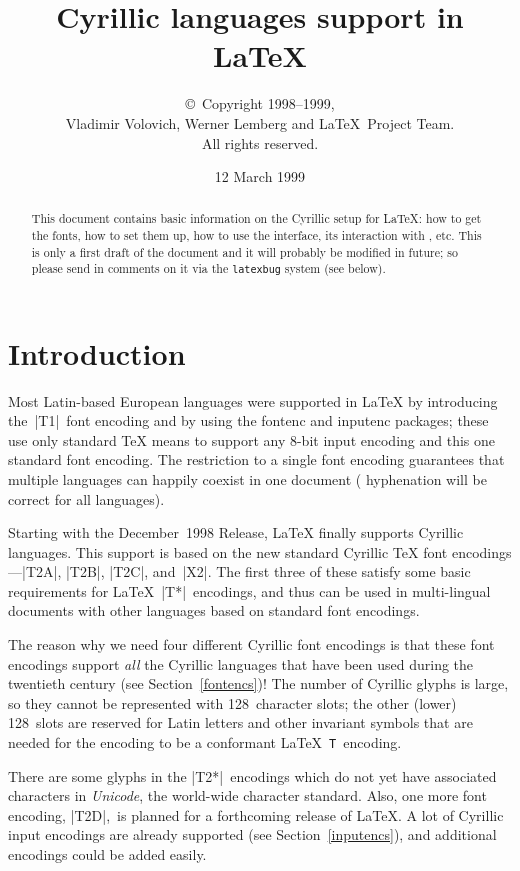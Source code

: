 \documentclass{ltxguide}[1999/02/28]
\title{Cyrillic languages support in \LaTeX}
\author{\copyright~Copyright 1998--1999,\\ Vladimir Volovich,
        Werner Lemberg and \LaTeX\ Project Team.\\ All rights reserved.}
\date{12 March 1999}
\begin{document}
\maketitle
\tableofcontents

\begin{abstract}
  This document contains basic information on the Cyrillic setup for
  \LaTeX{}: how to get the fonts, how to set them up, how to use
  the interface, its interaction with \babel{}, etc. This is only a first
  draft of the document and it will probably be modified in future; so
  please send in comments on it via the \texttt{latexbug} system
  (see below).
\end{abstract}


\section{Introduction}

Most Latin-based European languages were supported in \LaTeX{} by
introducing the~|T1|~font encoding and by using the \textsf{fontenc}
and \textsf{inputenc} packages; these use only standard \TeX{} means
to support any \mbox{8-bit} input encoding and this one standard font
encoding.  The restriction to a single font encoding guarantees that
multiple languages can happily coexist in one document (\eg
hyphenation will be correct for all languages).

Starting with the December~1998 Release, \LaTeX{} finally supports
Cyrillic languages.  This support is based on the new standard
Cyrillic \TeX{} font encodings---|T2A|, |T2B|, |T2C|, and~|X2|.  The
first three of these satisfy some basic requirements for
\LaTeX{}~|T*|~encodings, and thus can be used in multi-lingual documents
with other languages based on standard font encodings.

The reason why we need four different Cyrillic font encodings is that
these font encodings support \emph{all} the Cyrillic languages that
have been used during the twentieth century (see
Section~\ref{fontencs})!  The number of Cyrillic glyphs is large, so
they cannot be represented with 128~character slots; the other (lower)
128~slots are reserved for Latin letters and other invariant symbols
that are needed for the encoding to be a conformant
\LaTeX{}~\texttt{T}~encoding.

There are some glyphs in the |T2*|~encodings which do not yet have
associated characters in \emph{Unicode}, the world-wide character
standard.  Also, one more font encoding, |T2D|,~is planned for a
forthcoming release of \LaTeX{}.  A lot of Cyrillic input encodings
are already supported (see Section~\ref{inputencs}), and additional
encodings could be added easily.
\end{document}
